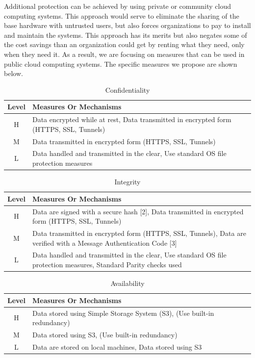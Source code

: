 \documentclass{acm_proc_article-sp}
\begin{document}
Additional protection can be achieved by using private or community cloud computing systems.  This approach would serve to eliminate the sharing of the base hardware with untrusted users, but also forces organizations to pay to install and maintain the systems.  This approach has its merits but also negates some of the cost savings than an organization could get by renting what they need, only when they need it.  As a result, we are focusing on measures that can be used in public cloud computing systems.  The specific measures we propose are shown below.


\begin{table}[ht]
\begin{tabular}{|c|p{2.5in}|}
\hline
Level &  Measures Or Mechanisms \\
\hline
H & Data encrypted while at rest, 
    Data transmitted in encrypted form (HTTPS, SSL, Tunnels) \\
\hline
M & Data transmitted in encrypted form (HTTPS, SSL, Tunnels) \\
\hline
L & Data handled and transmitted in the clear,
    Use standard OS file protection measures \\
\hline
\end{tabular}
\caption{Confidentiality}
\end{table}

\begin{table}[ht]
\begin{tabular}{|c|p{2.5in}|}
\hline
Level &  Measures Or Mechanisms \\
\hline
H & Data are signed with a secure hash [2],
    Data transmitted in encrypted form (HTTPS, SSL, Tunnels)\\
\hline
M & Data transmitted in encrypted form (HTTPS, SSL, Tunnels),
    Data are verified with a Message Authentication Code [3]\\
\hline
L & Data handled and transmitted in the clear,
    Use standard OS file protection measures, 
    Standard Parity checks used\\
\hline
\end{tabular}
\caption{Integrity}
\end{table}

\begin{table}[ht]
\begin{tabular}{|c|p{2.5in}|}
\hline
Level &  Measures Or Mechanisms \\
\hline
H & Data stored using Simple Storage System (S3),
    (Use built-in redundancy) \\
\hline  
M & Data stored using S3,
    (Use built-in redundancy)\\
\hline
L & Data are stored on local machines,
    Data stored using S3 \\
\hline
\end{tabular}  
\caption{Availability}
\end{table}
\end{document}
